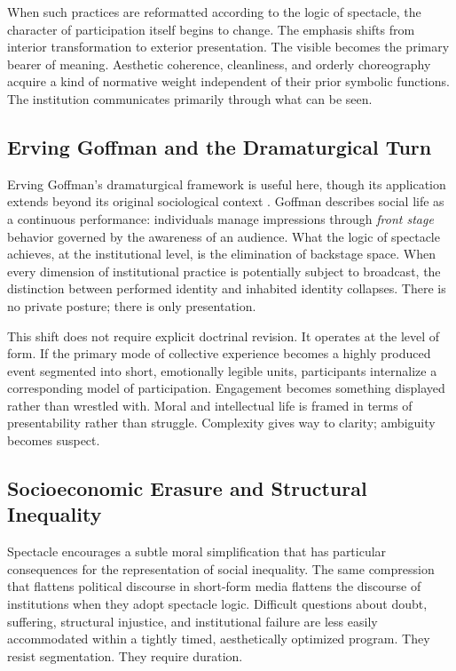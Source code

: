 \documentclass[12pt]{article}
\begin{document}
When such practices are reformatted according to the logic of spectacle, the character of participation itself begins to change. The emphasis shifts from interior transformation to exterior presentation. The visible becomes the primary bearer of meaning. Aesthetic coherence, cleanliness, and orderly choreography acquire a kind of normative weight independent of their prior symbolic functions. The institution communicates primarily through what can be seen.

\subsection{Erving Goffman and the Dramaturgical Turn}

Erving Goffman's dramaturgical framework is useful here, though its application extends beyond its original sociological context \citep{Goffman1959}. Goffman describes social life as a continuous performance: individuals manage impressions through \emph{front stage} behavior governed by the awareness of an audience. What the logic of spectacle achieves, at the institutional level, is the elimination of backstage space. When every dimension of institutional practice is potentially subject to broadcast, the distinction between performed identity and inhabited identity collapses. There is no private posture; there is only presentation.

This shift does not require explicit doctrinal revision. It operates at the level of form. If the primary mode of collective experience becomes a highly produced event segmented into short, emotionally legible units, participants internalize a corresponding model of participation. Engagement becomes something displayed rather than wrestled with. Moral and intellectual life is framed in terms of presentability rather than struggle. Complexity gives way to clarity; ambiguity becomes suspect.

\subsection{Socioeconomic Erasure and Structural Inequality}

Spectacle encourages a subtle moral simplification that has particular consequences for the representation of social inequality. The same compression that flattens political discourse in short-form media flattens the discourse of institutions when they adopt spectacle logic. Difficult questions about doubt, suffering, structural injustice, and institutional failure are less easily accommodated within a tightly timed, aesthetically optimized program. They resist segmentation. They require duration.
\end{document}
